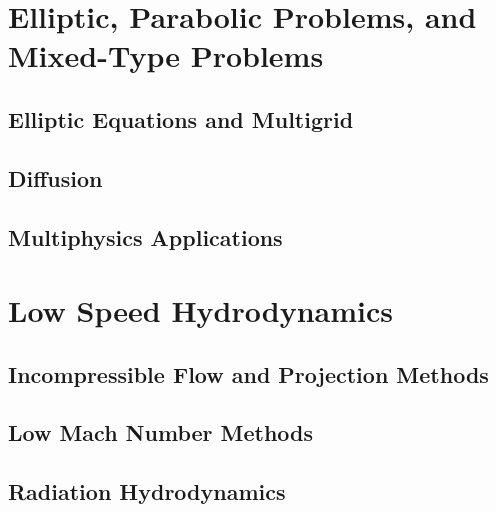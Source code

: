 \documentclass[11pt]{book}
\begin{document}





\part{Elliptic, Parabolic Problems, and Mixed-Type Problems}

\chapter{Elliptic Equations and Multigrid}



\chapter{Diffusion}



\chapter{Multiphysics Applications}




\part{Low Speed Hydrodynamics}

\chapter{Incompressible Flow and Projection Methods}



\chapter{Low Mach Number Methods}



\ifdefined\debugmode
\chapter{Radiation Hydrodynamics}
\end{document}
